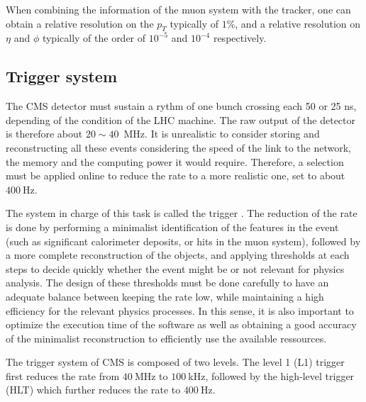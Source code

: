         When combining the information of the muon system with the tracker, one can
        obtain a relative resolution on the $p_T$ typically of $1\%$, and a relative
        resolution on $\eta$ and $\phi$ typically of the order of $10^{-5}$ and $10^{-4}$
        respectively.

        \subsection{Trigger system}

        The CMS detector must sustain a rythm of one bunch crossing each 50 or 25 ns, depending
        of the condition of the LHC machine. The raw output of the detector is therefore
        about $20\sim40$~MHz. It is unrealistic to consider storing and reconstructing all these events
        considering the speed of the link to the network, the memory and the computing power
        it would require. Therefore, a selection must be applied online to reduce the rate
        to a more realistic one, set to about $400~$Hz.

        The system in charge of this task is called the trigger \cite{CMStrigger}. The reduction of the rate
        is done by performing a minimalist identification of the features in the event (such
        as significant calorimeter deposits, or hits in the muon system), followed by a more
        complete reconstruction of the objects, and applying thresholds at each steps to
        decide quickly whether the event might be or not relevant for physics analysis.
        The design of these thresholds must be done carefully to have an adequate balance
        between keeping the rate low, while maintaining a high efficiency for the relevant
        physics processes. In this sense, it is also important to optimize the execution
        time of the software as well as obtaining a good accuracy of the minimalist
        reconstruction to efficiently use the available ressources.

        The trigger system of CMS is composed of two levels. The level 1 (L1) trigger first
        reduces the rate from $40~$MHz to $100~$kHz, followed by the high-level trigger (HLT)
        which further reduces the rate to $400~$Hz.


